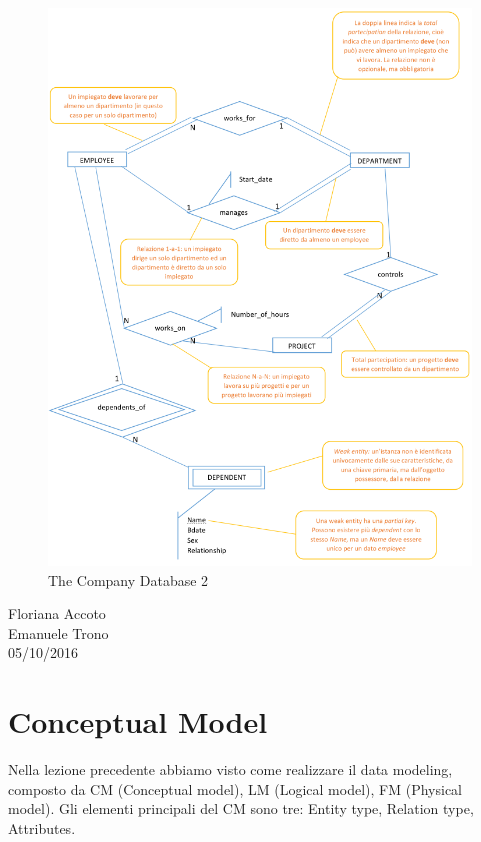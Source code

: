 \begin{center}
\begin{figure}[H]
\centering
\includegraphics[scale=0.8]{figures/tcdBIG2.png}
\caption{The Company Database 2} 
\end{figure}
\end{center}

\begin{flushright}Floriana Accoto\\Emanuele Trono\\05/10/2016\end{flushright}


\section{Conceptual Model}

Nella lezione precedente abbiamo visto come realizzare il data modeling, composto da CM (Conceptual model), LM (Logical model), FM (Physical model). 
Gli elementi principali del CM sono tre: Entity type, Relation type, Attributes.

